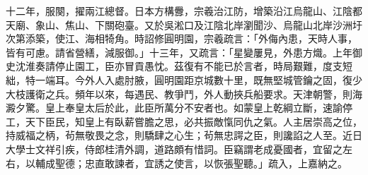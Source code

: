 \begin{pinyinscope}
十二年，服闋，擢兩江總督。日本方構釁，宗羲治江防，增築沿江烏龍山、江陰都天廟、象山、焦山、下關砲臺。又於吳淞口及江陰北岸瀏聞沙、烏龍山北岸沙洲圩次第添築，使江、海相犄角。時詔修圓明園，宗羲疏言：「外侮內患，天時人事，皆有可慮。請省營繕，減服御。」十三年，又疏言：「星變屢見，外患方熾。上年御史沈淮奏請停止園工，臣亦冒貢愚忱。茲復有不能已於言者，時局艱難，度支短絀，特一端耳。今外人入處肘腋，圓明園距京城數十里，既無堅城管鑰之固，復少大枝護衛之兵。頻年以來，每遇民、教爭鬥，外人動挾兵船要求。天津朝警，則海澱夕驚。皇上奉皇太后於此，此臣所萬分不安者也。如蒙皇上乾綱立斷，速諭停工，天下臣民，知皇上有臥薪嘗膽之思，必共振敵愾同仇之氣。人主居崇高之位，持威福之柄，茍無敬畏之念，則驕肆之心生；茍無忠諤之臣，則讒諂之人至。近日大學士文祥引疾，侍郎桂清外調，道路頗有惜詞。臣竊謂老成憂國者，宜留之左右，以輔成聖德；忠直敢諫者，宜誘之使言，以恢張聖聽。」疏入，上嘉納之。


\end{pinyinscope}
